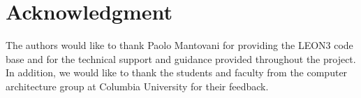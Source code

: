 \section*{Acknowledgment}                                                                                                                                                                                

The authors would like to thank Paolo Mantovani for providing the LEON3 code base and for the technical support and guidance provided throughout the project. In addition, we would like to thank the students and faculty from the computer architecture group at Columbia University for their feedback.                 

